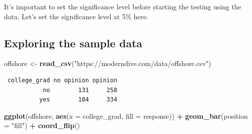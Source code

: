 \documentclass[12pt, krantz2,]{krantz}
\makeatletter
\newenvironment{Shaded}{\begin{snugshade}}{\end{snugshade}}
\newcommand{\DataTypeTok}[1]{\textcolor[rgb]{0.27,0.27,0.27}{#1}}
\newcommand{\KeywordTok}[1]{\textcolor[rgb]{0.27,0.27,0.27}{\textbf{#1}}}
\newcommand{\NormalTok}[1]{#1}
\newcommand{\OperatorTok}[1]{\textcolor[rgb]{0.43,0.43,0.43}{\textbf{#1}}}
\newcommand{\StringTok}[1]{\textcolor[rgb]{0.5,0.5,0.5}{#1}}
\newenvironment{kframe}{%
\medskip{}
\setlength{\fboxsep}{.8em}
 \def\at@end@of@kframe{}%
 \ifinner\ifhmode%
  \def\at@end@of@kframe{\end{minipage}}%
  \begin{minipage}{\columnwidth}%
 \fi\fi%
 \def\FrameCommand##1{\hskip\@totalleftmargin \hskip-\fboxsep
 \colorbox{shadecolor}{##1}\hskip-\fboxsep
     \hskip-\linewidth \hskip-\@totalleftmargin \hskip\columnwidth}%
 \MakeFramed {\advance\hsize-\width
   \@totalleftmargin\z@ \linewidth\hsize
   \@setminipage}}%
 {\par\unskip\endMakeFramed%
 \at@end@of@kframe}
\renewenvironment{Shaded}{\begin{kframe}}{\end{kframe}}
\makeatother
\begin{document}
It's important to set the significance level before starting the testing using the data. Let's set the significance level at 5\% here.

\hypertarget{exploring-the-sample-data-2}{%
\subsection{Exploring the sample data}\label{exploring-the-sample-data-2}}

\begin{Shaded}
\begin{Highlighting}[]
\NormalTok{offshore <-}\StringTok{ }\KeywordTok{read_csv}\NormalTok{(}\StringTok{"https://moderndive.com/data/offshore.csv"}\NormalTok{)}
\end{Highlighting}
\end{Shaded}

\begin{Shaded}
\end{Shaded}

\begin{verbatim}
 college_grad no opinion opinion
           no        131     258
          yes        104     334
\end{verbatim}

\begin{Shaded}
\end{Shaded}

\begin{Shaded}
\begin{Highlighting}[]
\KeywordTok{ggplot}\NormalTok{(offshore, }\KeywordTok{aes}\NormalTok{(}\DataTypeTok{x =}\NormalTok{ college_grad, }\DataTypeTok{fill =}\NormalTok{ response)) }\OperatorTok{+}
\StringTok{  }\KeywordTok{geom_bar}\NormalTok{(}\DataTypeTok{position =} \StringTok{"fill"}\NormalTok{) }\OperatorTok{+}
\StringTok{  }\KeywordTok{coord_flip}\NormalTok{()}
\end{Highlighting}
\end{Shaded}
\end{document}
